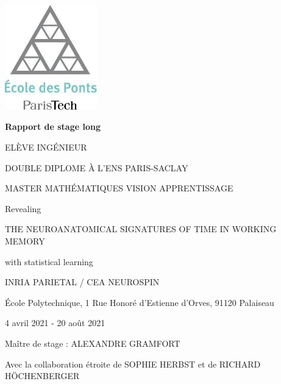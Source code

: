 \begin{titlepage}
    \begin{center}
        
        
        \includegraphics[width=4cm]{preliminaries/images/logo_ponts.jpg}
        
        \vspace{0.5cm}
        

        \vspace{1.5cm}
        
        \textbf{\Large Rapport de stage long}
        
        \vspace{0.5cm}
        
        \MakeUppercase{\theauthor{}}
        
        \MakeUppercase{Elève ingénieur}
        
        \MakeUppercase{Double diplome à l'ENS Paris-Saclay}

        \MakeUppercase{Master Mathématiques Vision Apprentissage}
        
        \vspace{1.5cm}
        
        Revealing
        
        \MakeUppercase{\Large the neuroanatomical signatures of time in working memory}
        
        with statistical learning
        
        
    
        
        
        
        \vfill
        
        \MakeUppercase{INRIA Parietal / CEA Neurospin}
        
        École Polytechnique, 1 Rue Honoré d'Estienne d'Orves, 91120 Palaiseau
        
        4 avril 2021 - 20 août 2021
        
        Maître de stage : \MakeUppercase{Alexandre Gramfort}
        
        Avec la collaboration étroite de \MakeUppercase{Sophie Herbst} et de \MakeUppercase{Richard Höchenberger}
        
    \end{center}
\end{titlepage}
